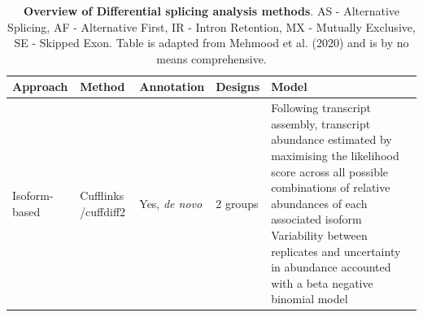 \begin{changemargin}{1.5cm}	
	\begin{landscape}
		\small %
		\setlength\tabcolsep{2pt} %
		\renewcommand{\arraystretch}{1}
	\begin{longtable}[c]{p{2.5cm}p{2cm}p{2cm}p{2.5cm}p{17cm}}
		\caption[Overview of Differential splicing analysis methods]%
		{\textbf{Overview of Differential splicing analysis methods}. \newline AS - Alternative Splicing, AF - Alternative First, IR - Intron Retention, MX - Mutually Exclusive, SE - Skipped Exon. Table is adapted from Mehmood et al. (2020) \cite{Mehmood2020} and is by no means comprehensive. }
		\label{tab: rnaseq_diffsplicing}\\
		\toprule
		Approach &
		Method &
		Annotation &
		Designs &
		Model \\ \midrule
		\multirow{2}{*}{Isoform-based} &
		Cufflinks \newline /cuffdiff2 &
		Yes, \textit{de novo} &
		2 groups &
		\tabitem Following transcript assembly, transcript abundance estimated by maximising the likelihood score across all possible combinations of relative abundances of each associated isoform \newline 
		\tabitem Variability between replicates and uncertainty in abundance accounted with a beta negative binomial model \\ 
		

\end{longtable}
\end{landscape}
\end{changemargin}
